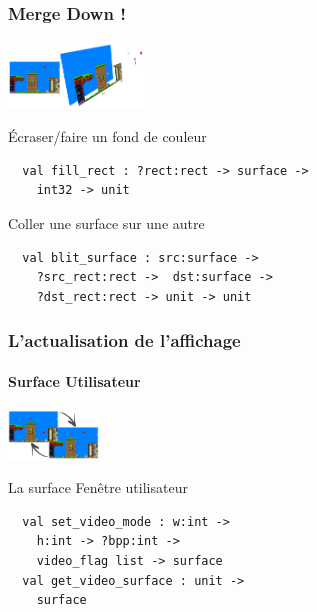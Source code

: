 \begin{frame}[fragile]
	\frametitle{\og{}Merge Down !\fg}
	\begin{center}
		\includegraphics[width=3.6cm]{pics/surfacesMerge.png}
	\end{center}
	\begin{block}{Écraser/faire un fond de couleur}
		\begin{lstlisting}
  val fill_rect : ?rect:rect -> surface -> 
    int32 -> unit
		\end{lstlisting}
	\end{block}
	\begin{block}{Coller une surface sur une autre}
		\begin{lstlisting}
  val blit_surface : src:surface -> 
    ?src_rect:rect ->  dst:surface -> 
    ?dst_rect:rect -> unit -> unit
		\end{lstlisting}
	\end{block}
\end{frame}

\begin{frame}[fragile]
	\frametitle{L'actualisation de l'affichage}
	\framesubtitle{Surface Utilisateur}
	\begin{center}
		\includegraphics[width=2.4cm]{pics/doubleBufferScreen.png}
	\end{center}
	\begin{block}{La surface \og{}Fenêtre utilisateur\fg}
		\begin{lstlisting}
  val set_video_mode : w:int -> 
    h:int -> ?bpp:int -> 
    video_flag list -> surface
  val get_video_surface : unit -> 
    surface
		\end{lstlisting}
	\end{block}
	
\end{frame}

